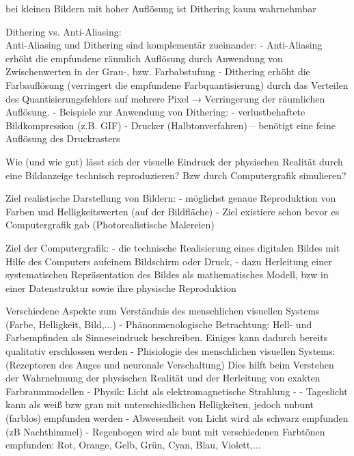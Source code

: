 \documentclass[10pt,landscape]{article}
\makeatletter
\renewcommand{\section}{\@startsection{section}{1}{0mm}%
                                {-1ex plus -.5ex minus -.2ex}%
                                {0.5ex plus .2ex}%
                                {\normalfont\large\bfseries}}
\renewcommand{\subsection}{\@startsection{subsection}{2}{0mm}%
                                {-1explus -.5ex minus -.2ex}%
                                {0.5ex plus .2ex}%
                                {\normalfont\normalsize\bfseries}}
\makeatother
\begin{document}
\begin{multicols}{3}
bei kleinen Bildern mit hoher Auflösung ist Dithering kaum wahrnehmbar

Dithering vs. Anti-Aliasing:\\ Anti-Aliasing und Dithering sind komplementär zueinander:
- Anti-Aliasing erhöht die empfundene räumlich Auflösung durch Anwendung von Zwischenwerten in der Grau-, bzw. Farbabstufung
- Dithering erhöht die Farbauflösung (verringert die empfundene Farbquantisierung) durch das Verteilen des Quantisierungsfehlers auf mehrere Pixel → Verringerung der räumlichen Auflösung.
- Beispiele zur Anwendung von Dithering:
  - verlustbehaftete Bildkompression (z.B. GIF)
  - Drucker (Halbtonverfahren) – benötigt eine feine Auflösung des Druckrasters


Wie (und wie gut) lässt sich der visuelle Eindruck der physischen Realität durch eine Bildanzeige technisch reproduzieren? Bzw durch Computergrafik simulieren?

Ziel realistische Darstellung von Bildern:
- möglichst genaue Reproduktion von Farben und Helligkeitswerten (auf der Bildfläche)
- Ziel existiere schon bevor es Computergrafik gab (Photorealistische Malereien)

Ziel der Computergrafik:
- die technische Realisierung eines digitalen Bildes mit Hilfe des Computers aufeinem Bildschirm oder Druck,
- dazu Herleitung einer systematischen Repräsentation des Bildes als mathematisches Modell, bzw in einer Datenstruktur sowie ihre physische Reproduktion

Verschiedene Aspekte zum Verständnis des menschlichen visuellen Systems (Farbe, Helligkeit, Bild,...)
- Phänonmenologische Betrachtung: Hell- und Farbempfinden als Sinneseindruck beschreiben. Einiges kann dadurch bereits qualitativ erschlossen werden
- Phisiologie des menschlichen visuellen Systems: (Rezeptoren des Auges und neuronale Verschaltung) Dies hilft beim Verstehen der Wahrnehmung der physischen Realität und der Herleitung von exakten Farbraummodellen
- Physik: Licht als elektromagnetische Strahlung
- 
- Tageslicht kann als weiß bzw grau mit unterschiedlichen Helligkeiten, jedoch unbunt (farblos) empfunden werden
- Abwesenheit von Licht wird als schwarz empfunden (zB Nachthimmel)
- Regenbogen wird als bunt mit verschiedenen Farbtönen empfunden: Rot, Orange, Gelb, Grün, Cyan, Blau, Violett,...



\end{multicols}
\end{document}
